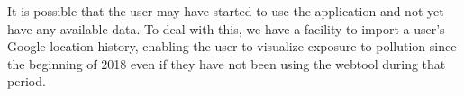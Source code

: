 It is possible that the user may have started to use the application and not yet have any available data.
To deal with this, we have a facility to import a user's Google location history, enabling the user to visualize
exposure to pollution since the beginning of 2018 even if they have not been using the webtool during that period.\\

